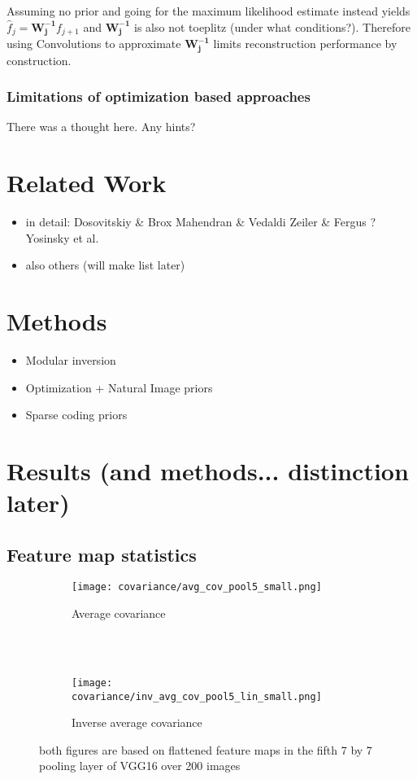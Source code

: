 \documentclass{article}
\begin{document}
Assuming no prior and going for the maximum likelihood estimate instead yields $\hat{f}_j = \bm{W_j^{-1}} f_{j+1}$ and $\bm{W_j^{-1}}$ is also not toeplitz (under what conditions?). Therefore using Convolutions to approximate $\bm{W_j^{-1}}$ limits reconstruction performance by construction.


\subsubsection{Limitations of optimization based approaches}

There was a thought here. Any hints?

\section{Related Work}

\begin{itemize}
	\item in detail:
		\subitem Dosovitskiy \& Brox
		\subitem Mahendran \& Vedaldi
		\subitem Zeiler \& Fergus ?
		\subitem Yosinsky et al.
	\item also others (will make list later)
\end{itemize}


\section{Methods}

\begin{itemize}
	\item Modular inversion
	\item Optimization + Natural Image priors
	\item Sparse coding priors
\end{itemize}



\section{Results (and methods... distinction later)}

\subsection{Feature map statistics}


\begin{figure}
	\centering
	\begin{subfigure}[b]{0.3\textwidth}
		\texttt{[image: covariance/avg\_cov\_pool5\_small.png]}
		\caption{Average covariance \\~}
		\label{fig:cov}
	\end{subfigure}
	~
	\begin{subfigure}[b]{0.3\textwidth}
		\texttt{[image: covariance/inv\_avg\_cov\_pool5\_lin\_small.png]}
		\caption{Inverse average covariance}
		\label{fig:inv_cov}
	\end{subfigure}
	\caption{both figures are based on flattened feature maps in the fifth 7 by 7 pooling layer of VGG16 over 200 images}
	\label{fig:cov_plots}
\end{figure}
\end{document}
